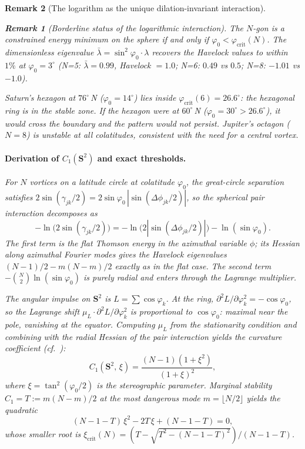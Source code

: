 \documentclass[12pt, a4paper]{article}
\newtheorem{remark}{Remark}[section]
\numberwithin{equation}{section}
\begin{document}
\begin{remark}[The logarithm as the unique dilation-invariant interaction]
\begin{remark}[Borderline status of the logarithmic interaction]
\noindent
The $N$-gon is a constrained energy minimum on the sphere if and only
if $\varphi_0 < \varphi_{\mathrm{crit}}(N)$.  The dimensionless
eigenvalue $\bar\lambda = \sin^2\!\varphi_0 \cdot \lambda$ recovers
the Havelock values to within $1\%$ at $\varphi_0 = 3^\circ$
(N=5: $\bar\lambda = 0.99$, Havelock $= 1.0$;
N=6: $0.49$ vs $0.5$; N=8: $-1.01$ vs $-1.0$).

Saturn's hexagon at $76^\circ$\,N ($\varphi_0 = 14^\circ$) lies
inside $\varphi_{\mathrm{crit}}(6) = 26.6^\circ$: the hexagonal
ring is in the stable zone.  If the hexagon were at $60^\circ$\,N
($\varphi_0 = 30^\circ > 26.6^\circ$), it would cross the boundary
and the pattern would not persist.  Jupiter's octagon ($N = 8$) is
unstable at all colatitudes, consistent with the need for a
central vortex.

\paragraph{Derivation of $C_1(\mathbf{S}^2)$ and exact thresholds.}
For $N$ vortices on a latitude circle at colatitude $\varphi_0$, the
great-circle separation satisfies
$2\sin(\gamma_{jk}/2) = 2\sin\varphi_0\,|\sin(\Delta\phi_{jk}/2)|$,
so the spherical pair interaction decomposes as
\[
  -\ln\bigl(2\sin(\gamma_{jk}/2)\bigr)
  = -\ln\bigl(2|\sin(\Delta\phi_{jk}/2)|\bigr) - \ln(\sin\varphi_0).
\]
The first term is the flat Thomson energy in the azimuthal variable
$\phi$; its Hessian along azimuthal Fourier modes gives the Havelock
eigenvalues $(N{-}1)/2 - m(N{-}m)/2$ exactly as in the flat case.
The second term $-\binom{N}{2}\ln(\sin\varphi_0)$ is purely
radial and enters through the Lagrange multiplier.

The angular impulse on $\mathbf{S}^2$ is $L = \sum\cos\varphi_k$.
At the ring, $\partial^2 L/\partial\varphi_k^2 = -\cos\varphi_0$,
so the Lagrange shift
$\mu_L\cdot\partial^2 L/\partial\varphi_k^2$ is proportional to
$\cos\varphi_0$: maximal near the pole, vanishing at the equator.
Computing $\mu_L$ from the stationarity condition and combining with
the radial Hessian of the pair interaction yields the curvature
coefficient (cf.\ \citealt{BoattoCabral2003}):
\begin{equation}\label{eq:C1_S2}
  C_1(\mathbf{S}^2,\,\xi) = \frac{(N-1)(1+\xi^2)}{(1+\xi)^2},
\end{equation}
where $\xi = \tan^2(\varphi_0/2)$ is the stereographic parameter.
Marginal stability $C_1 = T := m(N{-}m)/2$ at the most dangerous
mode $m = \lfloor N/2 \rfloor$ yields the quadratic
\begin{equation}\label{eq:xi_crit_S2}
  (N{-}1{-}T)\,\xi^2 - 2T\,\xi + (N{-}1{-}T) = 0,
\end{equation}
whose smaller root is
$\xi_{\mathrm{crit}}(N) = (T - \sqrt{T^2 - (N{-}1{-}T)^2})/(N{-}1{-}T)$.


\end{remark}
\end{remark}
\end{document}
